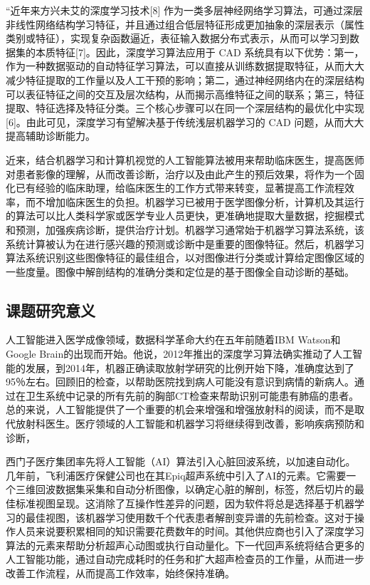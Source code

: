 “近年来方兴未艾的深度学习技术[8] 作为一类多层神经网络学习算法，可通过深层非线性网络结构学习特征，并且通过组合低层特征形成更加抽象的深层表示（属性类别或特征），实现复杂函数逼近，表征输入数据分布式表示，从而可以学习到数据集的本质特征[7]。因此，深度学习算法应用于 CAD 系统具有以下优势：第一，作为一种数据驱动的自动特征学习算法，可以直接从训练数据提取特征，从而大大减少特征提取的工作量以及人工干预的影响；第二，通过神经网络内在的深层结构可以表征特征之间的交互及层次结构，从而揭示高维特征之间的联系；第三，特征提取、特征选择及特征分类。三个核心步骤可以在同一个深层结构的最优化中实现[6]。由此可见，深度学习有望解决基于传统浅层机器学习的 CAD 问题，从而大大提高辅助诊断能力。

近来，结合机器学习和计算机视觉的人工智能算法被用来帮助临床医生，提高医师对患者影像的理解，从而改善诊断，治疗以及由此产生的预后效果，将作为一个固化已有经验的临床助理，给临床医生的工作方式带来转变，显著提高工作流程效率，而不增加临床医生的负担。机器学习已被用于医学图像分析，计算机及其运行的算法可以比人类科学家或医学专业人员更快，更准确地提取大量数据，挖掘模式和预测，加强疾病诊断，提供治疗计划。机器学习通常始于机器学习算法系统，该系统计算被认为在进行感兴趣的预测或诊断中是重要的图像特征。然后，机器学习算法系统识别这些图像特征的最佳组合，以对图像进行分类或计算给定图像区域的一些度量。图像中解剖结构的准确分类和定位是的基于图像全自动诊断的基础。

\subsection{课题研究意义}

人工智能进入医学成像领域，数据科学革命大约在五年前随着IBM Watson和Google Brain的出现而开始。他说，2012年推出的深度学习算法确实推动了人工智能的发展，到2014年，机器正确读取放射学研究的比例开始下降，准确度达到了95％左右。回顾旧的检查，以帮助医院找到病人可能没有意识到病情的新病人。通过在卫生系统中记录的所有先前的胸部CT检查来帮助识别可能患有肺癌的患者。总的来说，人工智能提供了一个重要的机会来增强和增强放射科的阅读，而不是取代放射科医生。医疗领域的人工智能和机器学习将继续得到改善，影响疾病预防和诊断，

西门子医疗集团率先将人工智能（AI）算法引入心脏回波系统，以加速自动化。几年前，飞利浦医疗保健公司也在其Epiq超声系统中引入了AI的元素。它需要一个三维回波数据集采集和自动分析图像，以确定心脏的解剖，标签，然后切片的最佳标准视图呈现。这消除了互操作性差异的问题，因为软件将总是选择基于机器学习的最佳视图，该机器学习使用数千个代表患者解剖变异谱的先前检查。这对于操作人员来说要积累相同的知识需要花费数年的时间。其他供应商也引入了深度学习算法的元素来帮助分析超声心动图或执行自动量化。下一代回声系统将结合更多的人工智能功能，通过自动完成耗时的任务和扩大超声检查员的工作量，从而进一步改善工作流程，从而提高工作效率，始终保持准确。

